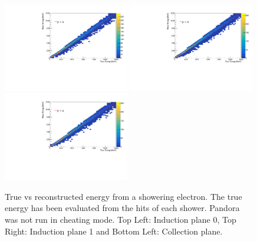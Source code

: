 \begin{figure}[h!]
    \centering
    \includegraphics[width = 0.49\textwidth]{figures-chap4/non_cheat/ESTAR_plane0_true_vs_reco.pdf}
    \includegraphics[width = 0.49\textwidth]{figures-chap4/non_cheat/ESTAR_plane1_true_vs_reco.pdf}
    \includegraphics[width = 0.49\textwidth]{figures-chap4/non_cheat/ESTAR_plane2_true_vs_reco.pdf}
    \captionsetup{width=0.45\textwidth}
    \parbox[b]{0.49\textwidth}%
    {
    \caption[True vs reconstructed energy from the ESTAR method without using Pandora in cheating mode.]
    {True vs reconstructed energy from a showering electron. The true energy has been evaluated from the hits of each shower. Pandora was not run in cheating mode. Top Left: Induction plane 0, Top Right: Induction plane 1 and Bottom Left: Collection plane. \\}
    \label{fig:ESTAR_true_vs_reco_no_cheat}}
\end{figure}

